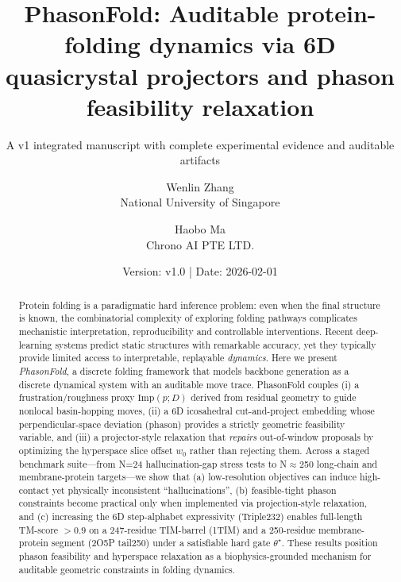 \title{PhasonFold: Auditable protein-folding dynamics via 6D quasicrystal projectors and phason feasibility relaxation}
\subtitle{A v1 integrated manuscript with complete experimental evidence and auditable artifacts}
\author{Wenlin Zhang\\National University of Singapore \and Haobo Ma\\Chrono AI PTE LTD.}
\date{Version: v1.0 | Date: 2026-02-01}
\maketitle
\begin{abstract}
Protein folding is a paradigmatic hard inference problem: even when the final structure is known, the combinatorial complexity of exploring folding pathways complicates mechanistic interpretation, reproducibility and controllable interventions. Recent deep-learning systems predict static structures with remarkable accuracy, yet they typically provide limited access to interpretable, replayable \emph{dynamics}. Here we present \emph{PhasonFold}, a discrete folding framework that models backbone generation as a discrete dynamical system with an auditable move trace. PhasonFold couples (i) a frustration/roughness proxy $\mathrm{Imp}(p;D)$ derived from residual geometry to guide nonlocal basin-hopping moves, (ii) a 6D icosahedral cut-and-project embedding whose perpendicular-space deviation (phason) provides a strictly geometric feasibility variable, and (iii) a projector-style relaxation that \emph{repairs} out-of-window proposals by optimizing the hyperspace slice offset $w_0$ rather than rejecting them. Across a staged benchmark suite---from N=24 hallucination-gap stress tests to N$\approx$250 long-chain and membrane-protein targets---we show that (a) low-resolution objectives can induce high-contact yet physically inconsistent ``hallucinations'', (b) feasible-tight phason constraints become practical only when implemented via projection-style relaxation, and (c) increasing the 6D step-alphabet expressivity (Triple232) enables full-length TM-score $>0.9$ on a 247-residue TIM-barrel (1TIM) and a 250-residue membrane-protein segment (2O5P tail250) under a satisfiable hard gate $\theta^\star$. These results position phason feasibility and hyperspace relaxation as a biophysics-grounded mechanism for auditable geometric constraints in folding dynamics.
\end{abstract}

